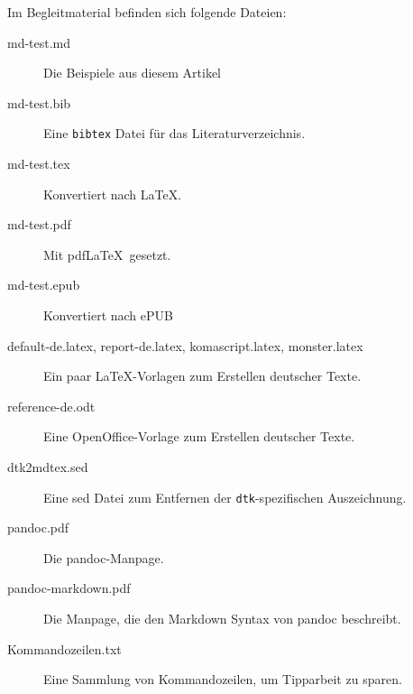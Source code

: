 \documentclass[11pt,ngerman,a4paper]{article}
\begin{document}
Im Begleitmaterial befinden sich folgende Dateien:

\begin{description}
\item[md-test.md]
Die Beispiele aus diesem Artikel
\item[md-test.bib]
Eine \texttt{bibtex} Datei für das Literaturverzeichnis.
\item[md-test.tex]
Konvertiert nach LaTeX.
\item[md-test.pdf]
Mit pdfLaTeX~gesetzt.
\item[md-test.epub]
Konvertiert nach ePUB
\item[default-de.latex, report-de.latex, komascript.latex,
monster.latex]
Ein paar LaTeX-Vorlagen zum Erstellen deutscher Texte.
\item[reference-de.odt]
Eine OpenOffice-Vorlage zum Erstellen deutscher Texte.
\item[dtk2mdtex.sed]
Eine sed Datei zum Entfernen der \texttt{dtk}-spezifischen Auszeichnung.
\item[pandoc.pdf]
Die pandoc-Manpage.
\item[pandoc-markdown.pdf]
Die Manpage, die den Markdown Syntax von pandoc beschreibt.
\item[Kommandozeilen.txt]
Eine Sammlung von Kommandozeilen, um Tipparbeit zu sparen.
\end{description}

\printbibliography
\end{document}

